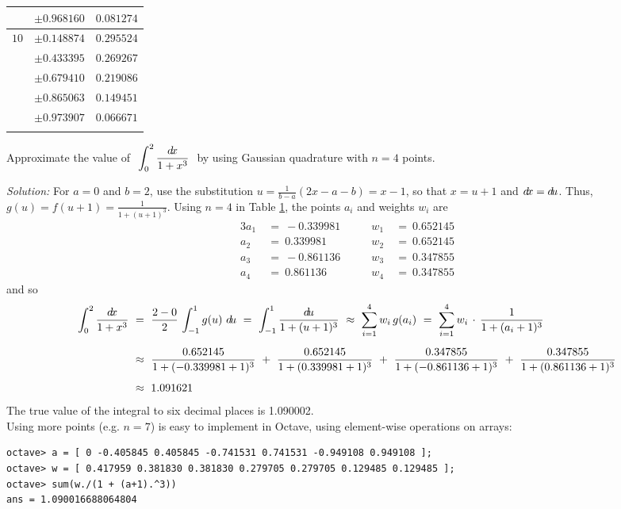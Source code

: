 \begin{center}
\begin{table}[ht]
{\begin{center}
\begin{tabular}{|c|l|c|}
{}  & $\pm 0.968160$ & $0.081274$\\
\hline
$10$ & $\pm 0.148874$ & $0.295524$\\
{}  & $\pm 0.433395$ & $0.269267$\\
{}  & $\pm 0.679410$ & $0.219086$\\
{}  & $\pm 0.865063$ & $0.149451$\\
{}  & $\pm 0.973907$ & $0.066671$\\
{} & {} & {}\\
\hline
\end{tabular}\end{center}}\label{tbl:gaussquad}
\end{table}\vspace{-1mm}
\end{center}
\newpage
\begin{exmp}\label{exmp:gaussquad}
\noindent Approximate the value of
$~\displaystyle\int_0^2 \dfrac{d\!x}{1 + x^3}~$ by using Gaussian quadrature with
$n=4$ points.\vspace{1mm}
\par\noindent\emph{Solution:} For $a=0$ and $b=2$, use the substitution
$u = \frac{1}{b-a}(2x - a - b) = x-1$, so that $x=u+1$ and $d\!x = d\!u$. Thus,
$g(u) = f(u+1) = \frac{1}{1 + (u+1)^3}$. Using
$n=4$ in Table \ref{tbl:gaussquad}, the points $a_i$ and weights $w_i$ are
\begin{alignat*}{3}
a_1 ~&=~ -0.339981 \quad\quad & w_1 ~&=~ 0.652145\\
a_2 ~&=~ 0.339981 \quad\quad & w_2 ~&=~ 0.652145\\
a_3 ~&=~ -0.861136 \quad\quad & w_3 ~&=~ 0.347855\\
a_4 ~&=~ 0.861136 \quad\quad & w_4 ~&=~ 0.347855
\end{alignat*}
and so
\begin{align*}
\int_0^2 \frac{d\!x}{1 + x^3} ~&=~ \frac{2-0}{2}\,\int_{-1}^1 g(u)~d\!u ~=~
 \int_{-1}^1 \frac{d\!u}{1 + (u+1)^3}
~\approx~ \sum_{i=1}^4 w_i\,g(a_i) ~=~ \sum_{i=1}^4 w_i\,\cdot\,\frac{1}{1 + (a_i+1)^3}\\[6pt]
&\approx~ \frac{0.652145}{1 + (-0.339981+1)^3} ~+~ \frac{0.652145}{1 + (0.339981+1)^3} ~+~
 \frac{0.347855}{1 + (-0.861136+1)^3} ~+~ \frac{0.347855}{1 + (0.861136+1)^3}\\[4pt]
&\approx~ 1.091621
\end{align*}
The true value of the integral to six decimal places is 1.090002.\\
\noindent Using more points (e.g. $n=7$) is easy to implement in Octave, using
element-wise operations on arrays:
\begin{Verbatim}[frame=single, framesep=2mm]
octave> a = [ 0 -0.405845 0.405845 -0.741531 0.741531 -0.949108 0.949108 ];
octave> w = [ 0.417959 0.381830 0.381830 0.279705 0.279705 0.129485 0.129485 ];
octave> sum(w./(1 + (a+1).^3))
ans = 1.090016688064804
\end{Verbatim}
\end{exmp}\vspace{-4mm}
\divider
\vspace{2mm}

